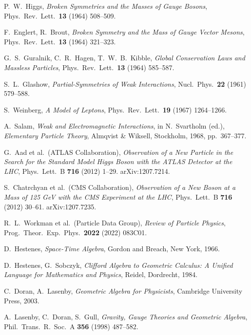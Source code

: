 \documentclass[11pt,a4paper]{article}
\theoremstyle{definition}
\theoremstyle{plain}
\theoremstyle{remark}
\begin{document}
\begin{thebibliography}{99}\setlength{\itemsep}{3pt}

P.~W.~Higgs, \emph{Broken Symmetries and the Masses of Gauge Bosons}, Phys.\ Rev.\ Lett.\ \textbf{13} (1964) 508--509.

F.~Englert, R.~Brout, \emph{Broken Symmetry and the Mass of Gauge Vector Mesons}, Phys.\ Rev.\ Lett.\ \textbf{13} (1964) 321--323.

G.~S.~Guralnik, C.~R.~Hagen, T.~W.~B.~Kibble, \emph{Global Conservation Laws and Massless Particles}, Phys.\ Rev.\ Lett.\ \textbf{13} (1964) 585--587.

S.~L.~Glashow, \emph{Partial-Symmetries of Weak Interactions}, Nucl.\ Phys.\ \textbf{22} (1961) 579--588.

S.~Weinberg, \emph{A Model of Leptons}, Phys.\ Rev.\ Lett.\ \textbf{19} (1967) 1264--1266.

A.~Salam, \emph{Weak and Electromagnetic Interactions}, in N.~Svartholm (ed.), \textit{Elementary Particle Theory}, Almqvist \& Wiksell, Stockholm, 1968, pp.~367--377.

G.~Aad et al.\ (ATLAS Collaboration), \emph{Observation of a New Particle in the Search for the Standard Model Higgs Boson with the ATLAS Detector at the LHC}, Phys.\ Lett.\ B \textbf{716} (2012) 1--29. arXiv:1207.7214.

S.~Chatrchyan et al.\ (CMS Collaboration), \emph{Observation of a New Boson at a Mass of 125 GeV with the CMS Experiment at the LHC}, Phys.\ Lett.\ B \textbf{716} (2012) 30--61. arXiv:1207.7235.

R.~L.~Workman et al.\ (Particle Data Group), \emph{Review of Particle Physics}, Prog.\ Theor.\ Exp.\ Phys.\ \textbf{2022} (2022) 083C01.

D.~Hestenes, \emph{Space-Time Algebra}, Gordon and Breach, New York, 1966.

D.~Hestenes, G.~Sobczyk, \emph{Clifford Algebra to Geometric Calculus: A Unified Language for Mathematics and Physics}, Reidel, Dordrecht, 1984.

C.~Doran, A.~Lasenby, \emph{Geometric Algebra for Physicists}, Cambridge University Press, 2003.

A.~Lasenby, C.~Doran, S.~Gull, \emph{Gravity, Gauge Theories and Geometric Algebra}, Phil.\ Trans.\ R.\ Soc.\ A \textbf{356} (1998) 487--582.


\end{thebibliography}
\end{document}
